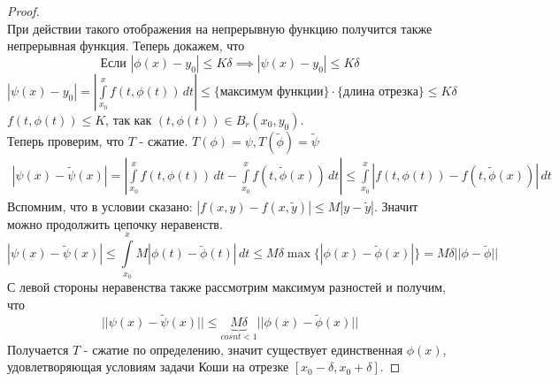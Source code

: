 \begin{theorem}[Пикара]
\begin{proof}
    \\ При действии такого отображения на непрерывную функцию получится также непрерывная функция. Теперь докажем, что
      \[ \text{Если } |\phi(x) - y_0| \le K\delta \implies |\psi(x) - y_0| \le K\delta \]
    $|\psi(x) - y_0| = \left|\int\limits_{x_0}^{x}{f(t, \phi(t))\, dt}\right| \le \{\text{максимум функции}\} \cdot \{\text{длина отрезка}\} \le K\delta$ \\
    $f(t, \phi(t)) \le K$, так как $(t, \phi(t)) \in B_r(x_0, y_0)$.
    \\ Теперь проверим, что $T$ - сжатие. $T(\phi) = \psi, T(\tilde\phi) = \tilde\psi$
    \[\begin{aligned} |\psi(x) - \tilde\psi(x)| = \left|\int\limits_{x_0}^{x}f(t, \phi(t))\, dt - \int\limits_{x_0}^{x}f(t, \tilde\phi(x))\, dt\right| \le \int\limits_{x_0}^{x}|f(t, \phi(t)) - f(t, \tilde\phi(x))|\, dt \end{aligned}\]
    Вспомним, что в условии сказано: $|f(x, y) - f(x, \tilde y)| \le M|y - \tilde y|$. Значит можно продолжить цепочку неравенств. 
    \[ |\psi(x) - \tilde\psi(x)| \le \int\limits_{x_0}^{x}M|\phi(t) - \tilde\phi(t)|\, dt \le M\delta\max\{|\phi(x) - \tilde\phi(x)|\} = M\delta||\phi - \tilde\phi|| \]
    С левой стороны неравенства также рассмотрим максимум разностей и получим, что
    \[ ||\psi(x) - \tilde\psi(x)|| \le \underbrace{M\delta}_{cosnt < 1} ||\phi(x) - \tilde\phi(x)|| \]
    Получается $T$ - сжатие по определению, значит существует единственная $\phi(x)$, удовлетворяющая условиям задачи Коши на отрезке $[x_0 - \delta, x_0 + \delta]$.
  \end{proof}
\end{theorem}

